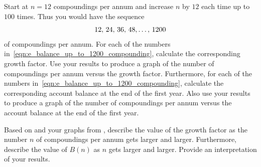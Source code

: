 \documentclass[a4paper,oneside,12pt]{article}
\begin{document}
\begin{problem}
\begin{packedenum}
  \item\label{subprob:e_balance_up_to_1200_compounding}
    Start at $n = 12$ compoundings per annum and increase $n$ by $12$
    each time up to $100$ times.  Thus you would have the sequence
    \begin{equation}
    \label{eqn:e_balance_up_to_1200_compounding}
    {{12},\,{24}},\, {{36},\, {48}}, \dots,\, {1200}
    \end{equation}
    of compoundings per annum.  For each of the numbers
    in~\eqref{eqn:e_balance_up_to_1200_compounding}, calculate the
    corresponding growth factor.  Use your results to produce a graph
    of the number of compoundings per annum versus the growth factor.
    Furthermore, for each of the numbers
    in~\eqref{eqn:e_balance_up_to_1200_compounding}, calculate the
    corresponding account balance at the end of the first year.  Also
    use your results to produce a graph of the number of compoundings
    per annum versus the account balance at the end of the first
    year.

  \item\label{subprob:e_balance_limit_of_growth_factor_balance}
    Based on  and
    your graphs from ,
    describe the value of the growth factor as the number $n$ of
    compoundings per annum gets larger and larger.  Furthermore,
    describe the value of $B(n)$ as $n$ gets larger and larger.
    Provide an interpretation of your results.


\end{packedenum}
\end{problem}
\end{document}
